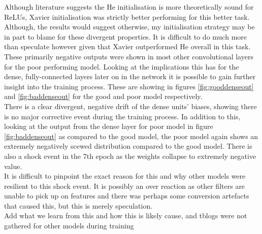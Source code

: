 \documentclass{article}
\begin{document}
{Although literature suggests the He initialisation is more theoretically sound for ReLUs, Xavier initialisation was strictly better performing for this better task. Although, the results would suggest otherwise, my initialisation strategy may be in part to blame for these divergent properties. It is difficult to do much more than speculate however given that Xavier outperformed He overall in this task. \\

These primarily negative outputs were shown in most other convolutional layers for the poor performing model. Looking at the implications this has for the dense, fully-connected layers later on in the network it is possible to gain further insight into the training process. These are showing in figures \ref{fig:gooddenseout} and \ref{fig:baddenseout} for the good and poor model respectively. \\

There is a clear divergent, negative drift of the dense units' biases, showing there is no major corrective event during the training process. In addition to this, looking at the output from the dense layer for poor model in figure \ref{fig:baddenseout} as compared to the good model, the poor model again shows an extremely negatively scewed distribution compared to the good model. There is also a shock event in the 7th epoch as the weights collapse to extremely negative value.\\

It is difficult to pinpoint the exact reason for this and why other models were resilient to this shock event. It is possibly an over reaction as other filters are unable to pick up on features and there was perhaps some conversion artefacts that caused this, but this is merely speculation. \\

Add what we learn from this and how this is likely cause, and tblogs were not gathered for other models during training

}
\end{document}
